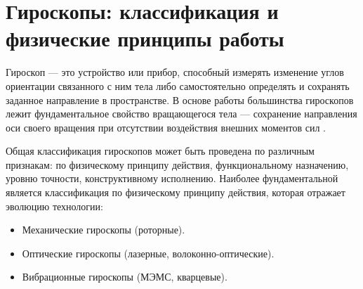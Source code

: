 \section{Гироскопы: классификация и физические принципы работы}
\label{sec:gyroscope}

Гироскоп — это устройство или прибор, способный измерять изменение углов ориентации связанного с ним тела либо самостоятельно определять и сохранять заданное направление в пространстве. В основе работы большинства гироскопов лежит фундаментальное свойство вращающегося тела — сохранение направления оси своего вращения при отсутствии воздействия внешних моментов сил \cite{babaeva1973giroskopy}.


Общая классификация гироскопов может быть проведена по различным признакам: по физическому принципу действия, функциональному назначению, уровню точности, конструктивному исполнению. Наиболее фундаментальной является классификация по физическому принципу действия, которая отражает эволюцию технологии:

\begin{itemize}
	\item Механические гироскопы (роторные).
	\item Оптические гироскопы (лазерные, волоконно-оптические).
	\item Вибрационные гироскопы (МЭМС, кварцевые).
\end{itemize}





